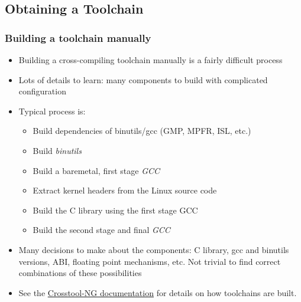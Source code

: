 \subsection{Obtaining a Toolchain}

\begin{frame}
  \frametitle{Building a toolchain manually}

  \begin{itemize}
  \item Building a cross-compiling toolchain manually is a fairly
    difficult process
  \item Lots of details to learn: many components to build with
    complicated configuration
  \item Typical process is:
    \begin{itemize}
    \item Build dependencies of binutils/gcc (GMP, MPFR, ISL, etc.)
    \item Build {\em binutils}
    \item Build a baremetal, first stage {\em GCC}
    \item Extract kernel headers from the Linux source code
    \item Build the C library using the first stage GCC
    \item Build the second stage and final {\em GCC}
    \end{itemize}
  \item Many decisions to make about the components: C library, gcc
    and binutils versions, ABI, floating point mechanisms, etc. Not
    trivial to find correct combinations of these possibilities
  \item See the
    \href{https://crosstool-ng.github.io/docs/toolchain-construction/}{Crosstool-NG
      documentation} for details on how toolchains are built.
\end{itemize}
\end{frame}

